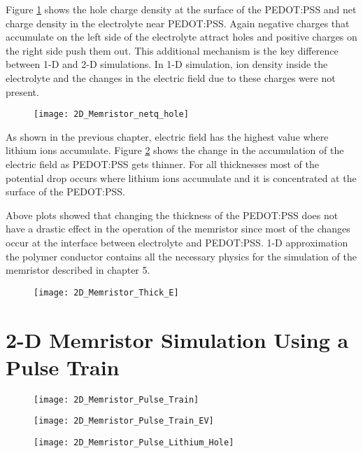 \begin{doublespace}
\clearpage
Figure \ref{thick_netq_p} shows the hole charge density at the surface of the PEDOT:PSS and net charge density in the electrolyte near PEDOT:PSS. Again negative charges that accumulate on the left side of the electrolyte attract holes and positive charges on the right side push them out. This additional mechanism is the key difference between 1-D and 2-D simulations. In 1-D simulation, ion density inside the electrolyte and the changes in the electric field due to these charges were not present.

\begin{figure}[!htp]
\centering
\texttt{[image: 2D\_Memristor\_netq\_hole]}
\caption{} 
\label{thick_netq_p}
\end{figure}

As shown in the previous chapter, electric field has the highest value where lithium ions accumulate. Figure \ref{thick_efield} shows the change in the accumulation of the electric field as PEDOT:PSS gets thinner. For all thicknesses most of the potential drop occurs where lithium ions accumulate and it is concentrated at the surface of the PEDOT:PSS. 

Above plots showed that changing the thickness of the PEDOT:PSS does not have a drastic effect in the operation of the memristor since most of the changes occur at the interface between electrolyte and PEDOT:PSS. 1-D approximation the polymer conductor contains all the necessary physics for the simulation of the memristor described in chapter 5.

\begin{figure}[!htp]
\centering
\texttt{[image: 2D\_Memristor\_Thick\_E]}
\caption{} 
\label{thick_efield}
\end{figure}


\clearpage
\section{2-D Memristor Simulation Using a Pulse Train}

\begin{figure}[!htp]
\centering
\texttt{[image: 2D\_Memristor\_Pulse\_Train]}
\caption{} 
\label{}
\end{figure}


\begin{figure}[!htp]
\centering
\texttt{[image: 2D\_Memristor\_Pulse\_Train\_EV]}
\caption{} 
\label{}
\end{figure}

\begin{figure}[!htp]
\centering
\texttt{[image: 2D\_Memristor\_Pulse\_Lithium\_Hole]}
\caption{} 
\label{}
\end{figure}


\end{doublespace}
